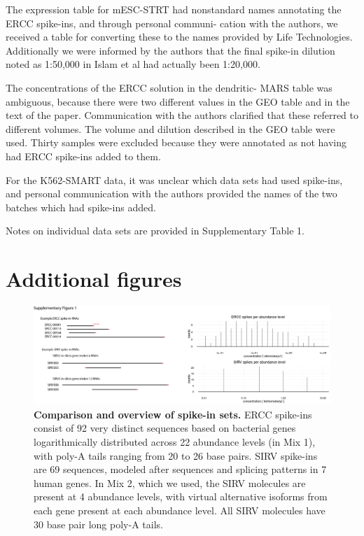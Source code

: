 The expression table for mESC-STRT had nonstandard names annotating the ERCC spike-ins, and through personal communi- cation with the authors, we received a table for converting these to the names provided by Life Technologies. Additionally we were informed by the authors that the final spike-in dilution noted as 1:50,000 in Islam et al \cite{Islam2014-dx} had actually been 1:20,000.

The concentrations of the ERCC solution in the dendritic- MARS table was ambiguous, because there were two different values in the GEO table and in the text of the paper. Communication with the authors clarified that these referred to different volumes. The volume and dilution described in the GEO table were used. Thirty samples were excluded because they were annotated as not having had ERCC spike-ins added to them.

For the K562-SMART data, it was unclear which data sets had used spike-ins, and personal communication with the authors provided the names of the two batches which had spike-ins added.

Notes on individual data sets are provided in Supplementary Table 1.

\section{Additional figures}

\begin{figure}
    \centering
    \includegraphics[width=\textwidth]{"Supp Figure 1"}
    \caption[Comparison and overview of spike-in sets]{\textbf{Comparison and overview of spike-in sets.} ERCC spike-ins consist of 92 very distinct sequences based on bacterial genes logarithmically distributed across 22 abundance levels (in Mix 1), with poly-A tails ranging from 20 to 26 base pairs. SIRV spike-ins are 69 sequences, modeled after sequences and splicing patterns in 7 human genes. In Mix 2, which we used, the SIRV molecules are present at 4 abundance levels, with virtual alternative isoforms from each gene present at each abundance level. All SIRV molecules have 30 base pair long poly-A tails.}
    \label{fig:spikeins}
\end{figure}

